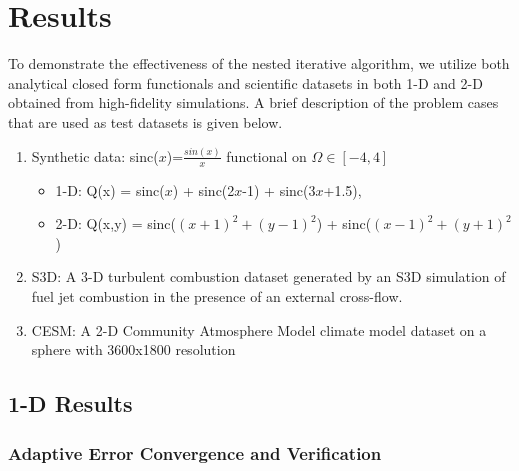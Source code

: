 
\section{Results}
\label{sec:results}

To demonstrate the effectiveness of the nested iterative algorithm, we utilize both analytical closed form functionals and scientific datasets in both 1-D and 2-D obtained from high-fidelity simulations. A brief description of the problem cases that are used as test datasets is given below.

\begin{enumerate}
	\item Synthetic data: sinc($x$)=$\frac{sin(x)}{x}$ functional on $\Omega \in [-4, 4]$
	\begin{itemize}
		\item 1-D: Q(x) = sinc($x$) + sinc(2$x$-1) + sinc(3$x$+1.5), 
		\item 2-D: Q(x,y) = sinc($(x+1)^2+(y-1)^2$) + sinc($(x-1)^2+(y+1)^2$)
	\end{itemize}
	\item S3D: A 3-D turbulent combustion dataset generated by an S3D simulation \cite{chen-s3d-2009} of fuel jet combustion in the presence of an external cross-flow. 
	\item CESM: A 2-D Community Atmosphere Model climate model dataset on a sphere with 3600x1800 resolution
\end{enumerate}


\subsection{1-D Results}\label{AA}


\subsubsection{Adaptive Error Convergence and Verification}

